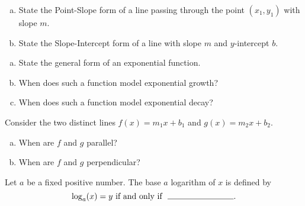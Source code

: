 \documentclass[12pt]{amsart}
\begin{document}
\begin{thm}[2 Points]
  \begin{enumerate}[(a)]
  \item
    State the Point-Slope form of a line passing through the point $(x_1, y_1)$ with slope $m$.
    \vspace{2in}
  \item
    State the Slope-Intercept form of a line with slope $m$ and $y$-intercept $b$.
    \vspace{2in}
  \end{enumerate}
\end{thm}

\newpage

\begin{thm}[3 Points]
  \begin{enumerate}[(a)]
  \item
    State the general form of an exponential function.
    \vspace{1in}
    \item
      When does such a function model exponential growth?
      \vspace{1in}
    \item
      When does such a function model exponential decay?
      \vspace{1in}
  \end{enumerate}
\end{thm}

\begin{thm}[2 Points]
  Consider the two distinct lines $f(x) = m_1x + b_1$ and $g(x) = m_2x + b_2$.
  \begin{enumerate}[(a)]
  \item
    When are $f$ and $g$ parallel?
    \vspace{1in}
  \item
    When are $f$ and $g$ perpendicular?
    \vspace{1in}
  \end{enumerate}
\end{thm}

\newpage

\begin{thm}[1 Point]
  Let $a$ be a fixed positive number.
  The base $a$ logarithm of $x$ is defined by
  $$\log_a(x) = y\  \text{if and only if}\ \ \line(1,0){80}.$$
\end{thm}
\end{document}
